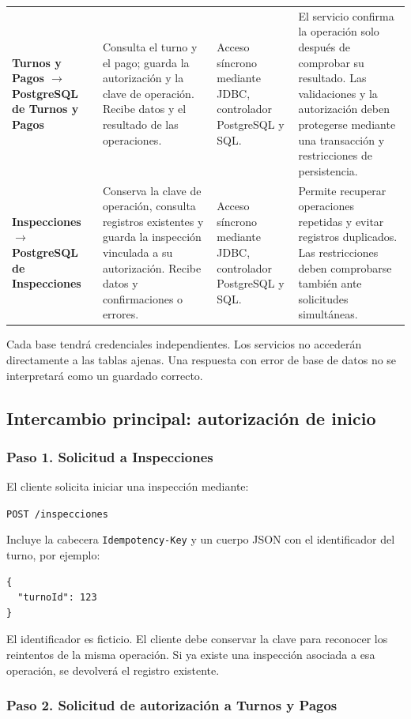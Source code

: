 \documentclass[11pt,a4paper]{article}
\begin{document}
\begin{xltabular}{\textwidth}{L{2.9cm}XXX}
  \textbf{Turnos y Pagos $\rightarrow$ PostgreSQL de Turnos y Pagos} & Consulta el turno y el pago; guarda la autorización y la clave de operación. Recibe datos y el resultado de las operaciones. & Acceso síncrono mediante JDBC, controlador PostgreSQL y SQL. & El servicio confirma la operación solo después de comprobar su resultado. Las validaciones y la autorización deben protegerse mediante una transacción y restricciones de persistencia. \\
  \textbf{Inspecciones $\rightarrow$ PostgreSQL de Inspecciones} & Conserva la clave de operación, consulta registros existentes y guarda la inspección vinculada a su autorización. Recibe datos y confirmaciones o errores. & Acceso síncrono mediante JDBC, controlador PostgreSQL y SQL. & Permite recuperar operaciones repetidas y evitar registros duplicados. Las restricciones deben comprobarse también ante solicitudes simultáneas. \\
\end{xltabular}

Cada base tendrá credenciales independientes. Los servicios no accederán directamente a las tablas ajenas. Una respuesta con error de base de datos no se interpretará como un guardado correcto.

\subsection{Intercambio principal: autorización de inicio}

\subsubsection{Paso 1. Solicitud a Inspecciones}

El cliente solicita iniciar una inspección mediante:

\texttt{POST /\allowbreak{}inspecciones}

Incluye la cabecera \texttt{Idempotency-Key} y un cuerpo JSON con el identificador del turno, por ejemplo:

\begin{lstlisting}
{
  "turnoId": 123
}
\end{lstlisting}

El identificador es ficticio. El cliente debe conservar la clave para reconocer los reintentos de la misma operación. Si ya existe una inspección asociada a esa operación, se devolverá el registro existente.

\subsubsection{Paso 2. Solicitud de autorización a Turnos y Pagos}
\end{document}
